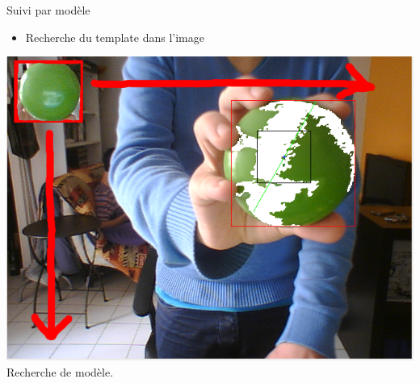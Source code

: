 \documentclass{beamer}
\begin{document}
            \begin{frame}{Suivi par modèle}
                  \begin{itemize}
                        \item{Recherche du template dans l'image}
                  \end{itemize}
		  \begin{center}
                        \includegraphics[scale=0.25]{Capture8.png}\\
                        Recherche de modèle.
                  \end{center}
            \end{frame}
            
\end{document}
